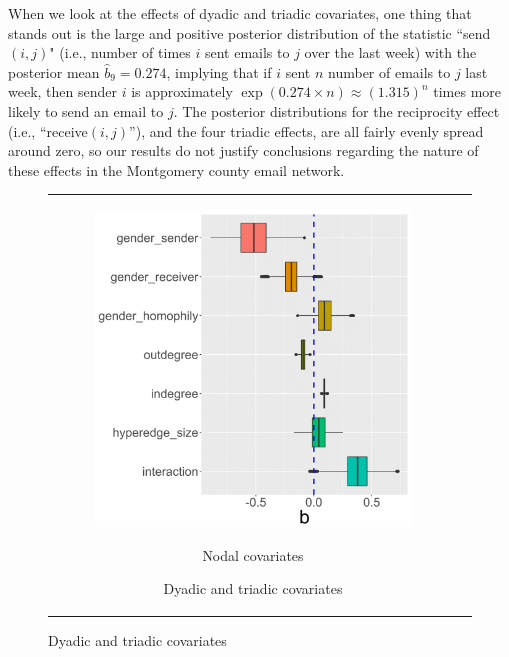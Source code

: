 \documentclass[ba]{imsart}
\numberwithin{equation}{section}
\theoremstyle{plain}
\begin{document}
	When we look at the effects of dyadic and triadic covariates, one thing that stands out is the large and positive posterior distribution of the statistic ``send$(i,j)$" (i.e., number of times $i$ sent emails to $j$ over the last week) with the posterior mean $\hat{b}_9 = 0.274$, implying that if $i$ sent $n$ number of emails to $j$ last week, then sender $i$ is approximately $\exp(0.274\times n)\approx(1.315)^n$ times more likely to send an email to $j$. The posterior distributions for the reciprocity effect (i.e., ``receive$(i, j)$''), and the four triadic effects, are all fairly evenly spread around zero, so our results do not justify conclusions regarding the nature of these effects in the Montgomery county email network.
			\begin{figure}[!t]
				\centering
				\begin{tabular}[t]{cc}
					\begin{subfigure}[b]{0.4975\textwidth}
						\caption{Nodal covariates}
						\includegraphics[width=\textwidth]{img/betanewplot2-1.png}
						\label{subfigure:betaresults1}	
					\end{subfigure}
					\begin{subfigure}[b]{0.4975\textwidth}
						\caption{Dyadic and triadic covariates}

\end{subfigure}
\end{tabular}
\end{figure}
\end{document}
